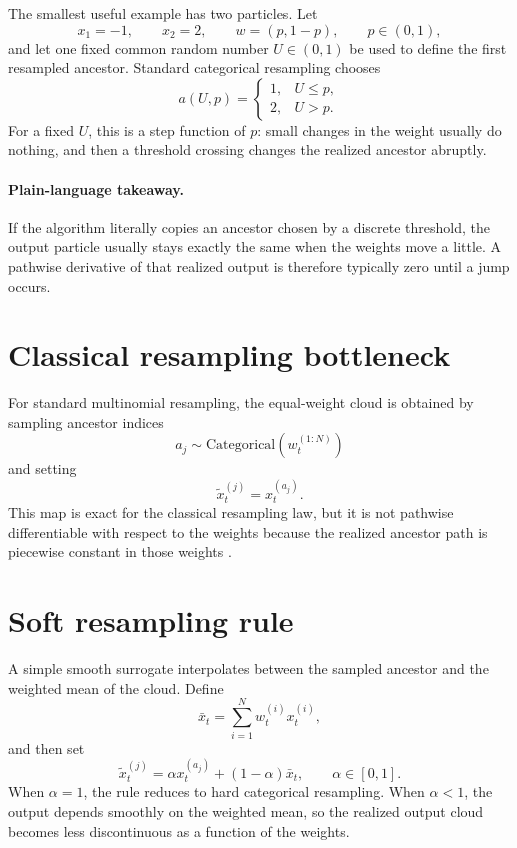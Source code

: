 The smallest useful example has two particles.  Let
\[
  x_1=-1,
  \qquad
  x_2=2,
  \qquad
  w=(p,1-p),
  \qquad
  p\in(0,1),
\]
and let one fixed common random number \(U\in(0,1)\) be used to define the first
resampled ancestor.  Standard categorical resampling chooses
\begin{equation}
\label{eq:bf-soft-categorical-choice}
  a(U,p)
  =
  \begin{cases}
    1, & U\le p,\\
    2, & U>p.
  \end{cases}
\end{equation}
For a fixed \(U\), this is a step function of \(p\): small changes in the weight
usually do nothing, and then a threshold crossing changes the realized ancestor
abruptly.

\paragraph{Plain-language takeaway.}
If the algorithm literally copies an ancestor chosen by a discrete threshold, the
output particle usually stays exactly the same when the weights move a little.  A
pathwise derivative of that realized output is therefore typically zero until a
jump occurs.

\section{Classical resampling bottleneck}
\label{sec:bf-soft-bottleneck}

For standard multinomial resampling, the equal-weight cloud is obtained by
sampling ancestor indices
\[
  a_j\sim\mathrm{Categorical}(w_t^{(1:N)})
\]
and setting
\begin{equation}
\label{eq:bf-soft-hard-resample}
  \tilde x_t^{(j)} = x_t^{(a_j)}.
\end{equation}
This map is exact for the classical resampling law, but it is not pathwise
differentiable with respect to the weights because the realized ancestor path is
piecewise constant in those weights \citep{zhumurphyjonschkowski2020,jonschkowski2018differentiable}.

\section{Soft resampling rule}
\label{sec:bf-soft-rule}

A simple smooth surrogate interpolates between the sampled ancestor and the
weighted mean of the cloud.  Define
\begin{equation}
\label{eq:bf-soft-mean}
  \bar x_t = \sum_{i=1}^N w_t^{(i)}x_t^{(i)},
\end{equation}
and then set
\begin{equation}
\label{eq:bf-soft-rule-eqn}
  \tilde x_t^{(j)}
  =
  \alpha x_t^{(a_j)} + (1-\alpha)\bar x_t,
  \qquad
  \alpha\in[0,1].
\end{equation}
When \(\alpha=1\), the rule reduces to hard categorical resampling.  When
\(\alpha<1\), the output depends smoothly on the weighted mean, so the realized
output cloud becomes less discontinuous as a function of the weights.

